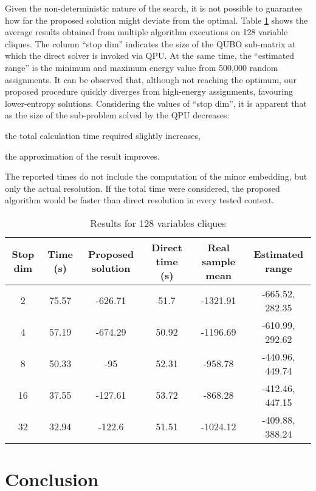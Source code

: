\documentclass{ceurart}
\begin{document}
\begin{spacing}{1}
Given the non-deterministic nature of the search, it is not possible to guarantee how far the proposed solution might deviate from the optimal. Table \ref{tab:qsplit} shows the average results obtained from multiple algorithm executions on 128 variable cliques. The column ``stop dim'' indicates the size of the QUBO sub-matrix at which the direct solver is invoked via QPU. At the same time, the ``estimated range'' is the minimum and maximum energy value from 500,000 random assignments. It can be observed that, although not reaching the optimum, our proposed procedure quickly diverges from high-energy assignments, favouring lower-entropy solutions. Considering the values of ``stop dim'', it is apparent that as the size of the sub-problem solved by the QPU decreases:
\begin{enumerate*}
    \item the total calculation time required slightly increases,
    \item the approximation of the result improves.
\end{enumerate*}
The reported times do not include the computation of the minor embedding, but only the actual resolution. If the total time were considered, the proposed algorithm would be faster than direct resolution in every tested context.

\begin{table}
    \centering
    \begin{tabular}{cccccc}
        \toprule
        Stop dim & Time (s) & Proposed solution & Direct time (s) & Real sample mean & Estimated range \\
        \midrule
        2 & 75.57 & -626.71 & 51.7 & -1321.91 & -665.52, 282.35 \\
        4 & 57.19 & -674.29 & 50.92 & -1196.69 & -610.99, 292.62 \\
        8 & 50.33 & -95 & 52.31 & -958.78 & -440.96, 449.74 \\
        16 & 37.55 & -127.61 & 53.72 & -868.28 & -412.46, 447.15 \\
        32 & 32.94 & -122.6 & 51.51 & -1024.12 & -409.88, 388.24 \\
        \bottomrule
    \end{tabular}
    \caption{Results for 128 variables cliques}
    \label{tab:qsplit}
\end{table}

\section{Conclusion}


\end{spacing}
\end{document}
